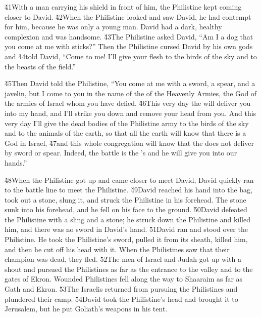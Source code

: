 \v{41}With a man carrying his shield in front of him, the Philistine kept coming closer to David. \v{42}When the Philistine looked and saw David, he had contempt for him, because he was only a young man. David had a dark, healthy complexion and was handsome. \v{43}The Philistine asked David, ``Am I a dog that you come at me with sticks?'' Then the Philistine cursed David by his own gods and \v{44}told David, ``Come to me! I'll give your flesh to the birds of the sky and to the beasts of the field.''

\v{45}Then David told the Philistine, ``You come at me with a sword, a spear, and a javelin, but I come to you in the name of the  of the Heavenly Armies, the God of the armies of Israel whom you have defied. \v{46}This very day the  will deliver you into my hand, and I'll strike you down and remove your head from you. And this very day I'll give the dead bodies of the Philistine army to the birds of the sky and to the animals of the earth, so that all the earth will know that there is a God in Israel, \v{47}and this whole congregation will know that the  does not deliver by sword or spear. Indeed, the battle is the 's and he will give you into our hands.''

\v{48}When the Philistine got up and came closer to meet David, David quickly ran to the battle line to meet the Philistine. \v{49}David reached his hand into the bag, took out a stone, slung it, and struck the Philistine in his forehead. The stone sunk into his forehead, and he fell on his face to the ground. \v{50}David defeated the Philistine with a sling and a stone; he struck down the Philistine and killed him, and there was no sword in David's hand. \v{51}David ran and stood over the Philistine. He took the Philistine's sword, pulled it from its sheath, killed him, and then he cut off his head with it. When the Philistines saw that their champion was dead, they fled. \v{52}The men of Israel and Judah got up with a shout and pursued the Philistines as far as the entrance to the valley and to the gates of Ekron. Wounded Philistines fell along the way to Shaaraim as far as Gath and Ekron. \v{53}The Israelis returned from pursuing the Philistines and plundered their camp. \v{54}David took the Philistine's head and brought it to Jerusalem, but he put Goliath's weapons in his tent.


